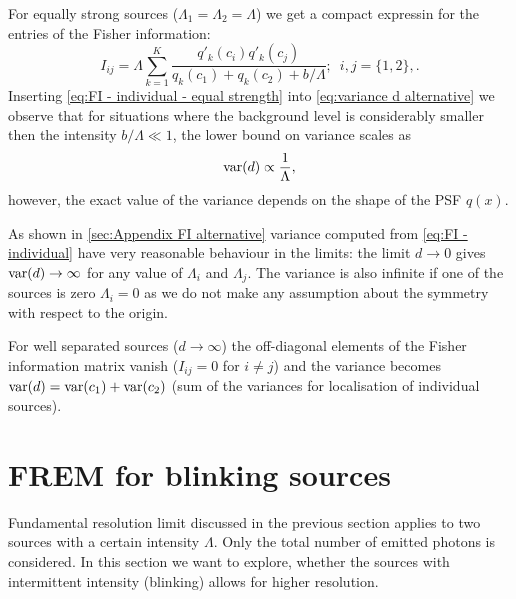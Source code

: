 For equally strong sources ($\Lambda_1=\Lambda_2=\Lambda$) we get a compact expressin for the entries of the Fisher information: 
%
\begin{equation}
	I_{ij} =\Lambda\sum_{k=1}^{K}\frac{q'_k(c_i)q'_k(c_j)}{q_k(c_1)+q_k(c_2)+b/\Lambda};\; \ i,j=\{1,2\},.
	\label{eq:FI - individual - equal strength}
\end{equation}
%
Inserting \autoref{eq:FI - individual - equal strength} into \autoref{eq:variance d alternative} we observe that for situations where the background level is considerably smaller then the intensity $b/\Lambda\ll1$, the lower bound on variance scales as
%
\begin{equation}
	\mathrm{var}(d)\propto\frac{1}{\Lambda}, 
\end{equation}
%
however, the exact value of the variance depends on the shape of the PSF $q(x)$.

As shown in \autoref{sec:Appendix FI alternative} variance computed from \autoref{eq:FI - individual} have very reasonable behaviour in the limits: the limit $d\rightarrow0$ gives $\mathrm{var}(d)\rightarrow\infty$ for any value of $\Lambda_i$ and $\Lambda_j$. The variance is also infinite if one of the sources is zero $\Lambda_i=0$ as we do not make any assumption about the symmetry with respect to the origin. 

For well separated sources ($d\rightarrow\infty$) the off-diagonal elements of the Fisher information matrix vanish ($I_{ij}=0$ for $i\neq j$) and the variance becomes $\mathrm{var}(d)=\mathrm{var}(c_1)+\mathrm{var}(c_2)$ (sum of the variances for localisation of individual sources).



\section{FREM for blinking sources}

Fundamental resolution limit discussed in the previous section applies to two sources with a certain intensity $\Lambda$. Only the total number of emitted photons is considered. In this section we want to explore, whether the sources with intermittent intensity (blinking) allows for higher resolution.

